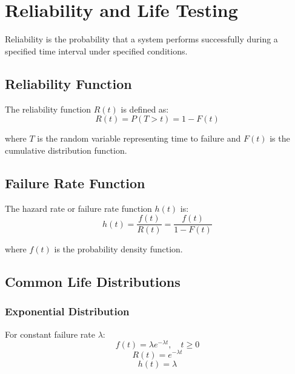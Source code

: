 \documentclass[twoside]{book}
\begin{document}



\section{Reliability and Life Testing}

Reliability is the probability that a system performs successfully during a specified time interval under specified conditions.

\subsection{Reliability Function}

The reliability function $R(t)$ is defined as:
$$R(t) = P(T > t) = 1 - F(t)$$

where $T$ is the random variable representing time to failure and $F(t)$ is the cumulative distribution function.

\subsection{Failure Rate Function}

The hazard rate or failure rate function $h(t)$ is:
$$h(t) = \frac{f(t)}{R(t)} = \frac{f(t)}{1-F(t)}$$

where $f(t)$ is the probability density function.

\subsection{Common Life Distributions}

\subsubsection{Exponential Distribution}

For constant failure rate $\lambda$:
$$f(t) = \lambda e^{-\lambda t}, \quad t \geq 0$$
$$R(t) = e^{-\lambda t}$$
$$h(t) = \lambda$$
\end{document}
